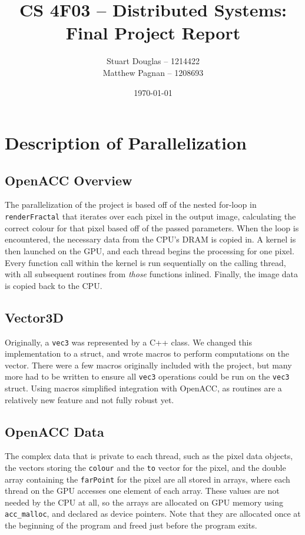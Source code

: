 \documentclass[11pt]{article}
\title{
\LARGE CS 4F03 -- Distributed Systems:
\\\vspace{10mm}
\large \textbf{Final Project Report}
\vspace{40mm}
}
\author{
Stuart Douglas -- 1214422
\\Matthew Pagnan -- 1208693
\vspace{10mm}
}
\date{\vfill \today}
\begin{document}
\maketitle
\newpage
\tableofcontents
\newpage

\section{Description of Parallelization}
\subsection{OpenACC Overview}
The parallelization of the project is based off of the nested for-loop in \texttt{renderFractal} that iterates over each pixel in the output image, calculating the correct colour for that pixel based off of the passed parameters. When the loop is encountered, the necessary data from the CPU's DRAM is copied in. A kernel is then launched on the GPU, and each thread begins the processing for one pixel. Every function call within the kernel is run sequentially on the calling thread, with all subsequent routines from \emph{those} functions inlined. Finally, the image data is copied back to the CPU.

\subsection{Vector3D}
Originally, a \texttt{vec3} was represented by a C++ class. We changed this implementation to a struct, and wrote macros to perform computations on the vector. There were a few macros originally included with the project, but many more had to be written to ensure all \texttt{vec3} operations could be run on the \texttt{vec3} struct. Using macros simplified integration with OpenACC, as routines are a relatively new feature and not fully robust yet.

\subsection{OpenACC Data}
The complex data that is private to each thread, such as the pixel data objects, the vectors storing the \texttt{colour} and the \texttt{to} vector for the pixel, and the double array containing the \texttt{farPoint} for the pixel are all stored in arrays, where each thread on the GPU accesses one element of each array. These values are not needed by the CPU at all, so the arrays are allocated on GPU memory using \texttt{acc\_malloc}, and declared as device pointers. Note that they are allocated once at the beginning of the program and freed just before the program exits.
\end{document}
